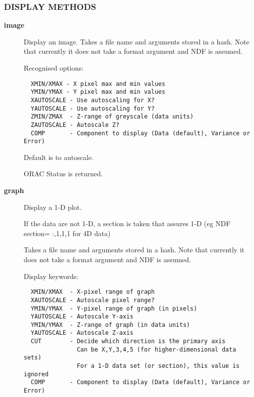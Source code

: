 \subsubsection*{DISPLAY METHODS\label{ORAC::Display::KAPVIEW_DISPLAY_METHODS}}\begin{description}
\item[\textbf{image}] \mbox{}

Display an image.
Takes a file name and arguments stored in a hash.
Note that currently it does not take a format argument
and NDF is assumed.



Recognised options:

\begin{verbatim}
  XMIN/XMAX - X pixel max and min values
  YMIN/YMAX - Y pixel max and min values
  XAUTOSCALE - Use autoscaling for X?
  YAUTOSCALE - Use autoscaling for Y?
  ZMIN/ZMAX  - Z-range of greyscale (data units)
  ZAUTOSCALE - Autoscale Z?
  COMP       - Component to display (Data (default), Variance or Error)
\end{verbatim}


Default is to autoscale.



ORAC Status is returned.

\item[\textbf{graph}] \mbox{}

Display a 1-D plot.



If the data are not 1-D, a section is taken that assures
1-D (eg NDF section= :,1,1,1 for 4D data)



Takes a file name and arguments stored in a hash.
Note that currently it does not take a format argument
and NDF is assumed.



Display keywords:

\begin{verbatim}
  XMIN/XMAX  - X-pixel range of graph
  XAUTOSCALE - Autoscale pixel range?
  YMIN/YMAX  - Y-pixel range of graph (in pixels)
  YAUTOSCALE - Autoscale Y-axis
  YMIN/YMAX  - Z-range of graph (in data units)
  YAUTOSCALE - Autoscale Z-axis
  CUT        - Decide which direction is the primary axis
               Can be X,Y,3,4,5 (for higher-dimensional data sets)
               For a 1-D data set (or section), this value is ignored
  COMP       - Component to display (Data (default), Variance or Error)
\end{verbatim}



\end{description}
